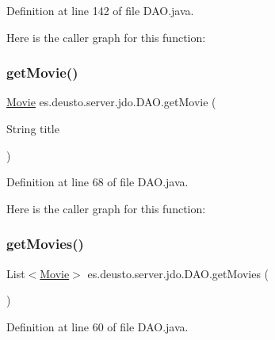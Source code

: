 Definition at line 142 of file D\+A\+O.\+java.

Here is the caller graph for this function\+:
\mbox{\label{classes_1_1deusto_1_1server_1_1jdo_1_1_d_a_o_a9bbbc5fb0fa218f2feefc3c813edc305}} 
\subsubsection{\texorpdfstring{getMovie()}{getMovie()}}
{\footnotesize\ttfamily \mbox{\hyperlink{classes_1_1deusto_1_1server_1_1jdo_1_1_movie}{Movie}} es.\+deusto.\+server.\+jdo.\+D\+A\+O.\+get\+Movie (\begin{DoxyParamCaption}\item[{String}]{title }\end{DoxyParamCaption})}



Definition at line 68 of file D\+A\+O.\+java.

Here is the caller graph for this function\+:
\mbox{\label{classes_1_1deusto_1_1server_1_1jdo_1_1_d_a_o_a23dfafaa747b95ec24c9df6ca678e7d7}} 
\subsubsection{\texorpdfstring{getMovies()}{getMovies()}}
{\footnotesize\ttfamily List$<$\mbox{\hyperlink{classes_1_1deusto_1_1server_1_1jdo_1_1_movie}{Movie}}$>$ es.\+deusto.\+server.\+jdo.\+D\+A\+O.\+get\+Movies (\begin{DoxyParamCaption}{ }\end{DoxyParamCaption})}



Definition at line 60 of file D\+A\+O.\+java.

\mbox{\label{classes_1_1deusto_1_1server_1_1jdo_1_1_d_a_o_a2f9f9eb5adc37f559d7fefe2da6544f1}} 
